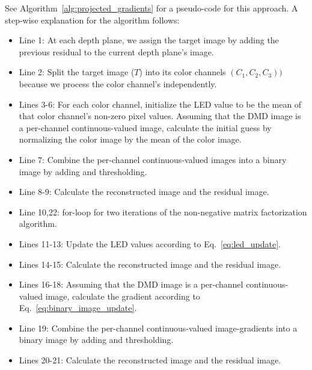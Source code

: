 See Algorithm~\ref{alg:projected_gradients} for a pseudo-code for this approach. A step-wise explanation for the algorithm follows:
\begin{itemize}
    \item Line 1: At each depth plane, we assign the target image by adding the previous residual to the current depth plane's image. 
    \item Line 2: Split the target image ($T$) into its color channels $(C_1, C_2, C_3))$ because we process the color channel's independently.
    \item Lines 3-6: For each color channel, initialize the LED value to be the mean of that color channel's non-zero pixel values. Assuming that the DMD image is a per-channel continuous-valued image, calculate the initial guess by normalizing the color image by the mean of the color image.  
    \item Line 7: Combine the per-channel continuous-valued images into a binary image by adding and thresholding. 
    \item Line 8-9: Calculate the reconstructed image and the residual image.
    \item Line 10,22: for-loop for two iterations of the non-negative matrix factorization algorithm.
    \item Lines 11-13: Update the LED values according to Eq.~\ref{eq:led_update}.
    \item Lines 14-15: Calculate the reconstructed image and the residual image.
    \item Lines 16-18: Assuming that the DMD image is a per-channel continuous-valued image, calculate the gradient according to Eq.~\ref{eq:binary_image_update}.
    \item Line 19: Combine the per-channel continuous-valued image-gradients into a binary image by adding and thresholding.
    \item Lines 20-21: Calculate the reconstructed image and the residual image.
\end{itemize}

